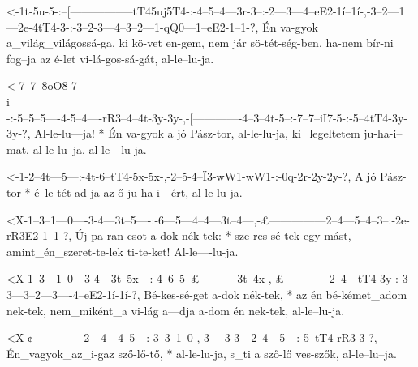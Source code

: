 
  {<-1t-5u-5-:--[-----------------tT45uj5T4-:-4--5--4---3r-3--:-2---3---4--eE2-1í--1í-,-3--2---1---2e-4tT4-3-:-3--2-3---4--3--2---1-qQ0---1--eE2-1--1-?,}
  {  Én va-gyok a_világ_világossá-ga,         ki kö-vet en-gem, nem jár sö-tét-ség-ben, ha-nem bír-ni fog--ja  az é-let vi-lá-gos-sá-gát, al-le--lu-ja.}


  {<-7--7--8oO8-7\\i\\-:-5--5--5----4-5--4----rR3--4--4t-3y-3y-,-[-------------4--3--4t-5--:-7--7--iI7-5-:-5--4tT4-3y-3y-?,}
  {  Al-le-lu---ja!    * Én va-gyok a jó Pász-tor, al-le-lu-ja,  ki_legeltetem ju-ha-i--mat, al-le-lu--ja, al-le---lu-ja.}


  {<-1-2--4t---5---:-4t-6--tT4-5x-5x-,-2--5-4--Ï3-wW1-wW1-:-0q-2r-2y-2y-?,}
  {  A jó Pász-tor * é--le-tét ad-ja   az ő ju ha-i---ért,  al-le-lu-ja.}




  {<X-1--3--1---0----3-4---3t--5----:-6---5---4--4---3t--4---,-£---------------2--4---5--4--3--:-2e-rR3E2-1--1-?,}
  {   Új pa-ran-csot a-dok nék-tek: * sze-res-sé-tek egy-mást, amint_én_szeret-te-lek ti-te-ket! Al-le----lu-ja.}


  {<X-1--3---1--0---3-4---3t--5x---:-4--6--5--£----------3t--4x-,-£------------2--4---tT4-3y-:-3-3---3--2---3----4--eE2-1í-1í-?,}
  {   Bé-kes-sé-get a-dok nék-tek, * az én bé-kémet_adom nek-tek, nem_miként_a vi-lág a---dja  a-dom én nek-tek, al-le--lu-ja.}


  {<X-¢--------------2---4---4--5---:-3--3--1--0-,-3----3-3---2--4---5---:-5--tT4-rR3-3-?,}
  {   Én_vagyok_az_i-gaz sző-lő-tő, * al-le-lu-ja, s_ti a sző-lő ves-szők, al-le--lu--ja.}


